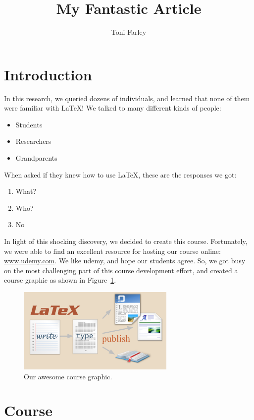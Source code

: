 \documentclass{proc}
\title{My Fantastic Article}
\author{Toni Farley}
\date{}
\begin{document}
\maketitle

\section{Introduction}

In this research, we queried dozens of individuals, and learned that none of them were familiar with \LaTeX!  We talked to many different kinds of people:

\begin{itemize}
\item Students
\item Researchers
\item Grandparents
\end{itemize}

\noindent When asked if they knew how to use \LaTeX, these are the responses we got:

\begin{enumerate}
\item What?
\item Who?
\item No
\end{enumerate}

In light of this shocking discovery, we decided to create this course. Fortunately, we were able to find an excellent resource for hosting our course online: \url{www.udemy.com}. We like udemy, and hope our students agree. So, we got busy on the most challenging part of this course development effort, and created a course graphic as shown in Figure~\ref{fig:course}.

\begin{figure}[htbp]
\begin{center}
\includegraphics[width=3in]{course_graphic}
\caption{Our awesome course graphic.}
\label{fig:course}
\end{center}
\end{figure}

\section{Course}
\end{document}
